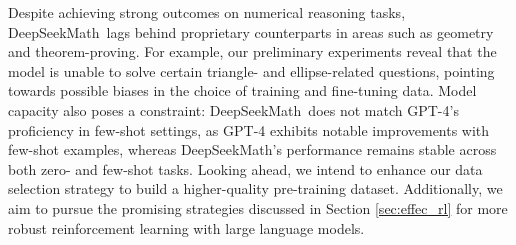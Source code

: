 Despite achieving strong outcomes on numerical reasoning tasks, DeepSeekMath~lags behind proprietary counterparts in areas such as geometry and theorem-proving. For example, our preliminary experiments reveal that the model is unable to solve certain triangle- and ellipse-related questions, pointing towards possible biases in the choice of training and fine-tuning data. Model capacity also poses a constraint: DeepSeekMath~does not match GPT-4’s proficiency in few-shot settings, as GPT-4 exhibits notable improvements with few-shot examples, whereas DeepSeekMath’s performance remains stable across both zero- and few-shot tasks. Looking ahead, we intend to enhance our data selection strategy to build a higher-quality pre-training dataset. Additionally, we aim to pursue the promising strategies discussed in Section \ref{sec:effec_rl} for more robust reinforcement learning with large language models.